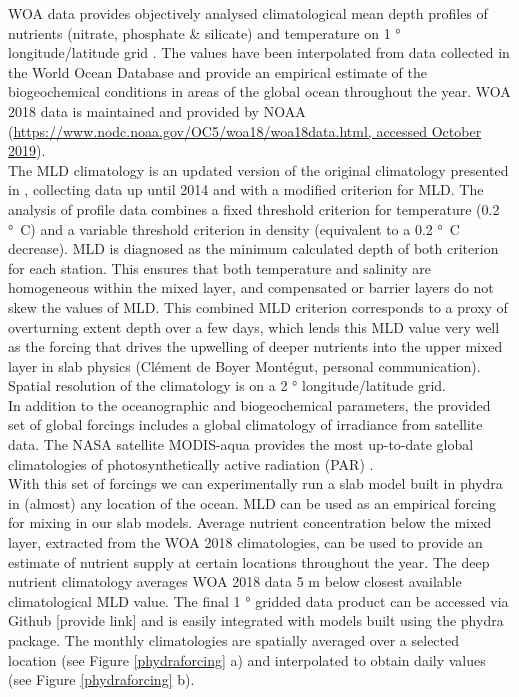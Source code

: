 \documentclass[template.tex]{subfiles}
\begin{document}
WOA data provides objectively analysed climatological mean depth profiles of nutrients (nitrate, phosphate \& silicate) and temperature on 1 \unit{°} longitude/latitude grid \cite{Garcia2019WORLDSilicate}. The values have been interpolated from data collected in the World Ocean Database and provide an empirical estimate of the biogeochemical conditions in areas of the global ocean throughout the year. WOA 2018 data is maintained and provided by NOAA (\url{https://www.nodc.noaa.gov/OC5/woa18/woa18data.html, accessed October 2019}).\\

The MLD climatology is an updated version of the original climatology presented in  \citet{deBoyerMontegut2004MixedClimatology}, collecting data up until 2014 and with a modified criterion for MLD. The analysis of profile data combines a fixed threshold criterion for temperature (0.2 \unit{°C}) and a variable threshold criterion in density (equivalent to a 0.2 \unit{°C} decrease). MLD is diagnosed as the minimum calculated depth of both criterion for each station. This ensures that both temperature and salinity are homogeneous within the mixed layer, and compensated or barrier layers do not skew the values of MLD. This combined MLD criterion corresponds to a proxy of overturning extent depth over a few days, which lends this MLD value very well as the forcing that drives the upwelling of deeper nutrients into the upper mixed layer in slab physics (Clément de Boyer Montégut, personal communication). Spatial resolution of the climatology is on a 2 \unit{°} longitude/latitude grid.\\

In addition to the oceanographic and biogeochemical parameters, the provided set of global forcings includes a global climatology of irradiance from satellite data. The NASA satellite MODIS-aqua provides the most up-to-date global climatologies of photosynthetically active radiation (PAR) \cite{MODIS-Aqua2018NASAGroup}. 
\\
With this set of forcings we can experimentally run a slab model built in phydra in (almost) any location of the ocean. MLD can be used as an empirical forcing for mixing in our slab models. Average nutrient concentration below the mixed layer, extracted from the WOA 2018 climatologies, can be used to provide an estimate of nutrient supply at certain locations throughout the year. The deep nutrient climatology averages WOA 2018 data 5 \unit{m} below closest available climatological MLD value. The final 1 \unit{°} gridded data product can be accessed via Github [provide link] and is easily integrated with models built using the phydra package. 
The monthly climatologies are spatially averaged over a selected location (see Figure \ref{phydraforcing} a) and interpolated to obtain daily values (see Figure \ref{phydraforcing} b).



\biblio
\end{document}
